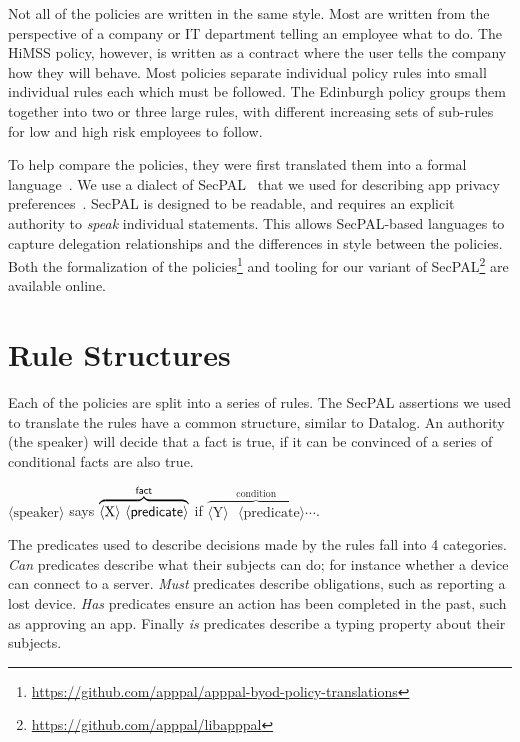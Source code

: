 \documentclass[conference,twocolumn]{IEEEtran}
\begin{document}
Not all of the policies are written in the same style.
Most are written from the perspective of a company or IT department telling an employee what to do.
The HiMSS policy, however, is written as a contract where the user tells the company how they will behave.
Most policies separate individual policy rules into small individual rules each which must be followed.
The Edinburgh policy groups them together into two or three large rules, with different increasing sets of sub-rules for low and high risk employees to follow.

To help compare the policies, they were first translated them into a formal language~\cite{hallett_specifying_2016}.
We use a dialect of SecPAL~\cite{becker_secpal:_2010} that we used for describing app privacy preferences~\cite{hallett_apppal_2016}.
SecPAL is designed to be readable, and requires an explicit authority to \emph{speak} individual statements.
This allows SecPAL-based languages to capture delegation relationships and the differences in style between the policies.
Both the formalization of the policies\footnote{\url{https://github.com/apppal/apppal-byod-policy-translations}} and tooling for our variant of SecPAL\footnote{\url{https://github.com/apppal/libapppal}} are available online.

\section{Rule Structures}

Each of the policies are split into a series of rules.
The SecPAL assertions we used to translate the rules have a common structure, similar to Datalog.
An authority (the speaker) will decide that a fact is true, if it can be convinced of a series of conditional facts are also true. 

\begin{center}\ttfamily\footnotesize%
  \newcommand{\sptoken}[1]{$\langle\text{#1}\rangle$}
  \sptoken{speaker} says $\overbrace{\text{\sptoken{X} \sptoken{\sf predicate}}}^{\text{\sf fact}}$ if $\overbrace{\text{\sptoken{Y} \sptoken{predicate}}}^{\text{condition}}\cdots$.
\end{center}

The predicates used to describe decisions made by the rules fall into 4 categories.
\emph{Can} predicates describe what their subjects can do; for instance whether a device can connect to a server.
\emph{Must} predicates describe obligations, such as reporting a lost device.
\emph{Has} predicates ensure an action has been completed in the past, such as approving an app.
Finally \emph{is} predicates describe a typing property about their subjects.
\end{document}
